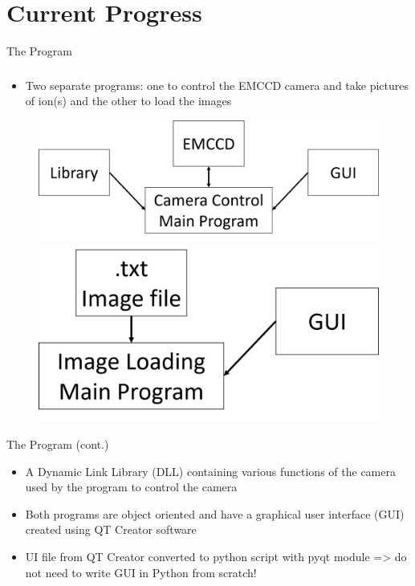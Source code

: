 \documentclass{beamer}
\begin{document}

\section{Current Progress}
\begin{frame}{The Program}
\frametitle{}

\begin{itemize}
\item Two separate programs: one to control the EMCCD camera and take pictures of ion(s) and the other to load the images 
\end{itemize} 
\vspace{0.3cm}
\begin{figure}
\begin{center}
\includegraphics[scale=0.3]{Figures/cam_flow_chart.png}\\
\vspace{0.3cm}
\includegraphics[scale=0.3]{Figures/img_load_flow_chart.png}
\end{center}
\end{figure}


\end{frame}

\begin{frame}{The Program (cont.)}

\begin{itemize}
\item A Dynamic Link Library (DLL) containing various functions of the camera used by the program to control the camera
\bigskip
\item Both programs are object oriented and have a graphical user interface (GUI) created using QT Creator software
\bigskip
\item UI file from QT Creator converted to python script with pyqt module => do not need to write GUI in Python from scratch!
\end{itemize}


\end{frame}
\end{document}
